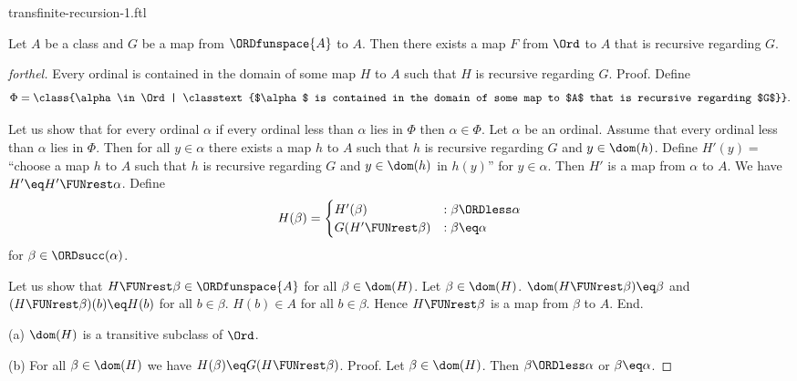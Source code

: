 \documentclass{naproche-library}
\begin{document}
\begin{smodule}[title=Transfinite Recursion I]{transfinite-recursion-1.ftl}
  
\begin{theorem}[forthel,title=Transfinite Recursion Theorem: Existence,id=transfinite-recursion_existence]
  Let $A$ be a class and $G$ be a map from $\ORDfunspace{A}$ to $A$.
  Then there exists a map $F$ from $\Ord$ to $A$ that is recursive regarding $G$.
\end{theorem}
\begin{proof}[forthel]
  Every ordinal is contained in the domain of some map $H$ to $A$ such that $H$ is recursive regarding $G$. \newline
  Proof.
    Define \[ \Phi = \class{\alpha \in \Ord | \classtext{$\alpha$ is contained in the domain of some map to $A$ that is recursive regarding $G$}}. \]

    Let us show that for every ordinal $\alpha$ if every ordinal less than $\alpha$ lies in $\Phi$ then $\alpha \in \Phi$.
      Let $\alpha$ be an ordinal.
      Assume that every ordinal less than $\alpha$ lies in $\Phi$.
      Then for all $y \in \alpha$ there exists a map $h$ to $A$ such that $h$ is recursive regarding $G$ and $y \in \dom(h)$.
      Define $H'(y) =$ ``choose a map $h$ to $A$ such that $h$ is recursive regarding $G$ and $y \in \dom(h)$ in $h(y)$'' for $y \in \alpha$.
      Then $H'$ is a map from $\alpha$ to $A$.
      We have $H' \eq H' \FUNrest \alpha$.
      Define \[ H(\beta) =
        \begin{cases}
          H'(\beta)                 & : \beta \ORDless \alpha \\
          G(H' \FUNrest \beta)  & : \beta \eq \alpha
        \end{cases} \]
      for $\beta \in \ORDsucc(\alpha)$.
      
      Let us show that $H \FUNrest \beta \in \ORDfunspace{A}$ for all $\beta \in \dom(H)$.
        Let $\beta \in \dom(H)$.
        $\dom(H \FUNrest \beta) \eq \beta$ and $(H \FUNrest \beta)(b) \eq H(b)$ for all $b \in \beta$.
        $H(b) \in A$ for all $b \in \beta$.
        Hence $H \FUNrest \beta$ is a map from $\beta$ to $A$.
      End.

      (a) $\dom(H)$ is a transitive subclass of $\Ord$.

      (b) For all $\beta \in \dom(H)$ we have $H(\beta) \eq G(H \FUNrest \beta)$. \newline
      Proof.
        Let $\beta \in \dom(H)$.
        Then $\beta \ORDless \alpha$ or $\beta \eq \alpha$.


\end{proof}
\end{smodule}
\end{document}

